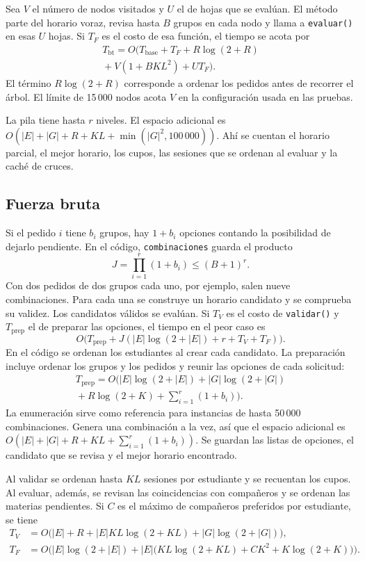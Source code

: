 \documentclass[11pt]{article}
\numberwithin{equation}{section}
\numberwithin{figure}{section}
\numberwithin{table}{section}
\theoremstyle{definition}
\begin{document}
Sea \(V\) el número de nodos visitados y \(U\) el de hojas que se
evalúan. El método parte del horario voraz, revisa hasta \(B\) grupos
en cada nodo y llama a \texttt{evaluar()} en esas \(U\) hojas. Si
\(T_F\) es el costo de esa función, el tiempo se acota por
\begin{multline*}
 T_{\mathrm{bt}} =
 O\bigl(T_{\mathrm{base}}+T_F+R\log(2+R)\\
         {}+V(1+BKL^2)+UT_F\bigr).
\end{multline*}
El término \(R\log(2+R)\) corresponde a ordenar los pedidos antes de
recorrer el árbol. El límite de 15\,000 nodos acota \(V\) en la
configuración usada en las pruebas.

La pila tiene hasta \(r\) niveles. El espacio adicional es
\(O(|E|+|G|+R+KL+\min(|G|^2,100\,000))\). Ahí se cuentan el horario
parcial, el mejor horario, los cupos, las sesiones que se ordenan al
evaluar y la caché de cruces.

\subsection{Fuerza bruta}

Si el pedido \(i\) tiene \(b_i\) grupos, hay \(1+b_i\) opciones
contando la posibilidad de dejarlo pendiente. En el código,
\texttt{combinaciones} guarda el producto
\[
 J=\prod_{i=1}^{r}(1+b_i)\le (B+1)^r.
\]
Con dos pedidos de dos grupos cada uno, por ejemplo, salen nueve
combinaciones. Para cada una se construye un horario candidato y se
comprueba su validez. Los candidatos válidos se evalúan. Si \(T_V\)
es el costo de \texttt{validar()} y \(T_{\mathrm{prep}}\) el de
preparar las opciones, el tiempo en el peor caso es
\[
 O\bigl(T_{\mathrm{prep}}+J(|E|\log(2+|E|)+r+T_V+T_F)\bigr).
\]
En el código se ordenan los estudiantes al crear cada candidato.
La preparación incluye ordenar los grupos y los pedidos y reunir
las opciones de cada solicitud:
\begin{multline*}
 T_{\mathrm{prep}}=O\biggl(|E|\log(2+|E|)+|G|\log(2+|G|)\\
                    {}+R\log(2+K)+\sum_{i=1}^{r}(1+b_i)\biggr).
\end{multline*}
La enumeración sirve como referencia para instancias de hasta
50\,000 combinaciones. Genera una combinación a la vez, así que el
espacio adicional es \(O(|E|+|G|+R+KL+\sum_{i=1}^{r}(1+b_i))\).
Se guardan las listas de opciones, el candidato que se revisa y el
mejor horario encontrado.

Al validar se ordenan hasta \(KL\) sesiones por estudiante y se
recuentan los cupos. Al evaluar, además, se revisan las coincidencias
con compañeros y se ordenan las materias pendientes. Si \(C\) es el
máximo de compañeros preferidos por estudiante, se tiene
\begin{align*}
 T_V &= O\bigl(|E|+R+|E|KL\log(2+KL)+|G|\log(2+|G|)\bigr),\\
 T_F &= O\bigl(|E|\log(2+|E|)
       + |E|\bigl(KL\log(2+KL)+CK^2+K\log(2+K)\bigr)\bigr).
\end{align*}
\end{document}
